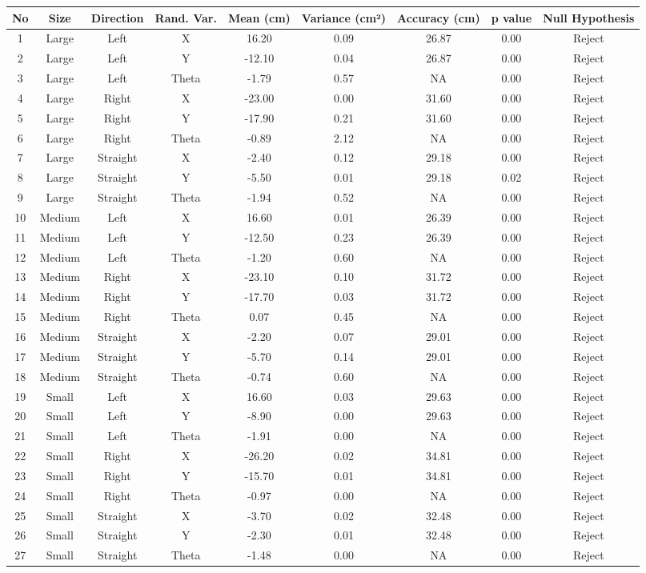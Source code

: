 \begin{table}[t!]
\centering
\footnotesize
\setlength{\tabcolsep}{4pt}
\begin{tabular}{|c|c|c|c|c|c|c|c|c|}
\hline
No & Size & Direction & Rand. Var. & Mean (cm) & Variance (cm²) & Accuracy (cm) & p value & Null Hypothesis \\ \hline
1 & Large & Left & X & 16.20 & 0.09 & 26.87 & 0.00 & Reject \\
2 & Large & Left & Y & -12.10 & 0.04 & 26.87 & 0.00 & Reject \\
3 & Large & Left & Theta & -1.79 & 0.57 & NA & 0.00 & Reject \\
4 & Large & Right & X & -23.00 & 0.00 & 31.60 & 0.00 & Reject \\
5 & Large & Right & Y & -17.90 & 0.21 & 31.60 & 0.00 & Reject \\
6 & Large & Right & Theta & -0.89 & 2.12 & NA & 0.00 & Reject \\
7 & Large & Straight & X & -2.40 & 0.12 & 29.18 & 0.00 & Reject \\
8 & Large & Straight & Y & -5.50 & 0.01 & 29.18 & 0.02 & Reject \\
9 & Large & Straight & Theta & -1.94 & 0.52 & NA & 0.00 & Reject \\
10 & Medium & Left & X & 16.60 & 0.01 & 26.39 & 0.00 & Reject \\
11 & Medium & Left & Y & -12.50 & 0.23 & 26.39 & 0.00 & Reject \\
12 & Medium & Left & Theta & -1.20 & 0.60 & NA & 0.00 & Reject \\
13 & Medium & Right & X & -23.10 & 0.10 & 31.72 & 0.00 & Reject \\
14 & Medium & Right & Y & -17.70 & 0.03 & 31.72 & 0.00 & Reject \\
15 & Medium & Right & Theta & 0.07 & 0.45 & NA & 0.00 & Reject \\
16 & Medium & Straight & X & -2.20 & 0.07 & 29.01 & 0.00 & Reject \\
17 & Medium & Straight & Y & -5.70 & 0.14 & 29.01 & 0.00 & Reject \\
18 & Medium & Straight & Theta & -0.74 & 0.60 & NA & 0.00 & Reject \\
19 & Small & Left & X & 16.60 & 0.03 & 29.63 & 0.00 & Reject \\
20 & Small & Left & Y & -8.90 & 0.00 & 29.63 & 0.00 & Reject \\
21 & Small & Left & Theta & -1.91 & 0.00 & NA & 0.00 & Reject \\
22 & Small & Right & X & -26.20 & 0.02 & 34.81 & 0.00 & Reject \\
23 & Small & Right & Y & -15.70 & 0.01 & 34.81 & 0.00 & Reject \\
24 & Small & Right & Theta & -0.97 & 0.00 & NA & 0.00 & Reject \\
25 & Small & Straight & X & -3.70 & 0.02 & 32.48 & 0.00 & Reject \\
26 & Small & Straight & Y & -2.30 & 0.01 & 32.48 & 0.00 & Reject \\
27 & Small & Straight & Theta & -1.48 & 0.00 & NA & 0.00 & Reject \\ \hline
\end{tabular}
\end{table}
